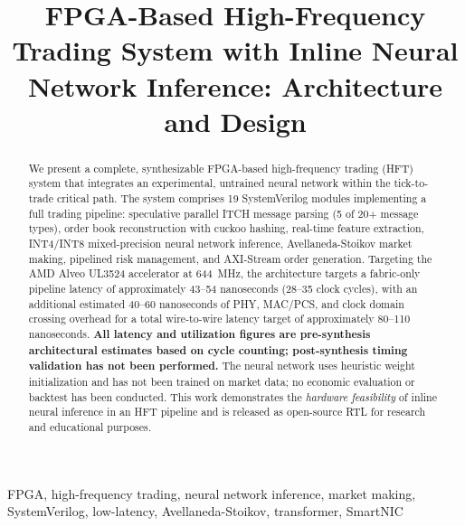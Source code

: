 \documentclass[conference,10pt]{IEEEtran}
\begin{document}
\title{FPGA-Based High-Frequency Trading System with Inline Neural Network Inference: Architecture and Design}

\author{
}

\maketitle

\begin{abstract}
We present a complete, synthesizable FPGA-based high-frequency trading (HFT) system that integrates an experimental, untrained neural network within the tick-to-trade critical path. The system comprises 19 SystemVerilog modules implementing a full trading pipeline: speculative parallel ITCH message parsing (5 of 20+ message types), order book reconstruction with cuckoo hashing, real-time feature extraction, INT4/INT8 mixed-precision neural network inference, Avellaneda-Stoikov market making, pipelined risk management, and AXI-Stream order generation. Targeting the AMD Alveo UL3524 accelerator at 644~MHz, the architecture targets a fabric-only pipeline latency of approximately 43--54 nanoseconds (28--35 clock cycles), with an additional estimated 40--60 nanoseconds of PHY, MAC/PCS, and clock domain crossing overhead for a total wire-to-wire latency target of approximately 80--110 nanoseconds. \textbf{All latency and utilization figures are pre-synthesis architectural estimates based on cycle counting; post-synthesis timing validation has not been performed.} The neural network uses heuristic weight initialization and has not been trained on market data; no economic evaluation or backtest has been conducted. This work demonstrates the \textit{hardware feasibility} of inline neural inference in an HFT pipeline and is released as open-source RTL for research and educational purposes.
\end{abstract}

\begin{IEEEkeywords}
FPGA, high-frequency trading, neural network inference, market making, SystemVerilog, low-latency, Avellaneda-Stoikov, transformer, SmartNIC
\end{IEEEkeywords}

\end{document}
